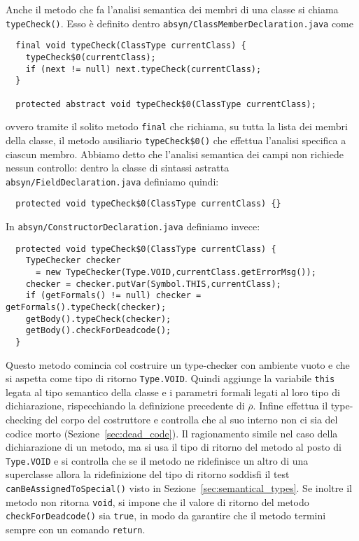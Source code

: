 Anche il metodo che fa l'analisi semantica dei membri di una classe si
chiama \texttt{typeCheck()}. Esso \`e definito dentro
\texttt{absyn/ClassMemberDeclaration.java} come
%
\begin{verbatim}
  final void typeCheck(ClassType currentClass) {
    typeCheck$0(currentClass);
    if (next != null) next.typeCheck(currentClass);
  }

  protected abstract void typeCheck$0(ClassType currentClass);
\end{verbatim}
ovvero tramite il solito metodo \texttt{final} che richiama, su tutta la
lista dei membri della classe, il metodo ausiliario
\texttt{typeCheck\$0()} che effettua l'analisi specifica a ciascun membro.
Abbiamo detto che l'analisi semantica dei campi non richiede nessun controllo:
dentro la classe di sintassi astratta
\texttt{absyn/FieldDeclaration.java} definiamo quindi:
%
\begin{verbatim}
  protected void typeCheck$0(ClassType currentClass) {}
\end{verbatim}
In \texttt{absyn/ConstructorDeclaration.java} definiamo invece:
%
\begin{verbatim}
  protected void typeCheck$0(ClassType currentClass) {
    TypeChecker checker
      = new TypeChecker(Type.VOID,currentClass.getErrorMsg());
    checker = checker.putVar(Symbol.THIS,currentClass);
    if (getFormals() != null) checker = getFormals().typeCheck(checker);
    getBody().typeCheck(checker);
    getBody().checkForDeadcode();
  }
\end{verbatim}
Questo metodo comincia col costruire un type-checker con ambiente vuoto e
che si aspetta come tipo di ritorno \texttt{Type.VOID}. Quindi aggiunge
la variabile \texttt{this} legata al tipo semantico
della classe e i parametri formali legati al loro tipo di dichiarazione,
rispecchiando la definizione precedente di $\overline{\rho}$.
Infine effettua il type-checking del corpo del costruttore e controlla che al
suo interno non ci sia del codice morto (Sezione~\ref{sec:dead_code}).
Il ragionamento \e simile nel caso della dichiarazione di un metodo,
ma si usa il tipo di ritorno del metodo al posto di \texttt{Type.VOID} e si
controlla che se il metodo ne ridefinisce un
altro di una superclasse allora la ridefinizione del tipo di ritorno
soddisfi il test \texttt{canBeAssignedToSpecial()}
visto in Sezione~\ref{sec:semantical_types}. Se inoltre il metodo non
ritorna \texttt{void}, si impone che il valore di ritorno del metodo
\texttt{checkForDeadcode()} sia \texttt{true}, in modo da garantire che
il metodo termini sempre con un comando \texttt{return}.

